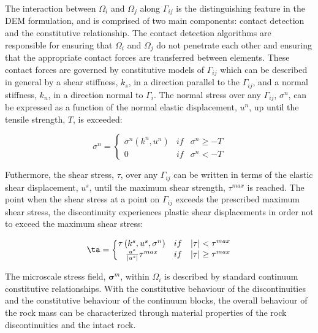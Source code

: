 
The interaction between $\Omega_i$ and $\Omega_j$ along $\Gamma_{ij}$ is the distinguishing feature in the DEM formulation, and is comprised of two main components: contact detection and the constitutive relationship. The contact detection algorithms are responsible for ensuring that $\Omega_i$ and $\Omega_j$ do not penetrate each other and ensuring that the appropriate contact forces are transferred between elements. These contact forces are governed by constitutive models of $\Gamma_{ij}$ which can be described in general by a shear stiffness, $k_s$, in a direction parallel to the $\Gamma_{ij}$, and a normal stiffness, $k_n$, in a direction normal to $\Gamma_i$. The normal stress over any $\Gamma_{ij}$, $\sigma^n$, can be expressed as a function of the normal elastic displacement, $u^n$, up until the tensile strength, $T$, is exceeded: 

\begin{equation}
\sigma^n=\left\{\begin{matrix}
\sigma^n\left(k^n, u^n\right) &if& \sigma^n \geq -T\\ 
 0 & if &\sigma^n < -T
\end{matrix}\right.
\label{eqn:demnormal}
\end{equation}

Futhermore, the shear stress, $\tau$, over any $\Gamma_{ij}$ can be written in terms of the elastic shear displacement, $u^s$, until the maximum shear strength, $\tau^{max}$ is reached. The point when the shear stress at a point on $\Gamma_{ij}$ exceeds the prescribed maximum shear stress, the discontinuity experiences plastic shear displacements in order not to exceed the maximum shear stress:

\begin{equation}
\ta=\left\{\begin{matrix}
\tau\left(k^s,u^s, \sigma^n\right) &if&\left |\tau \right | < \tau^{max}\\ 
\frac{u^s}{\left|u^s\right|}\tau^{max} & if &\left |\tau \right | \geq \tau^{max}
\end{matrix}\right.
\label{eqn:demshear}
\end{equation}

The microscale stress field, $\boldsymbol{\sigma}^m$, within $\Omega_i$ is described by standard continuum constitutive relationships. With the constitutive behaviour of the discontinuities and the constitutive behaviour of the continuum blocks, the overall behaviour of the rock mass can be characterized through material properties of the rock discontinuities and the intact rock.